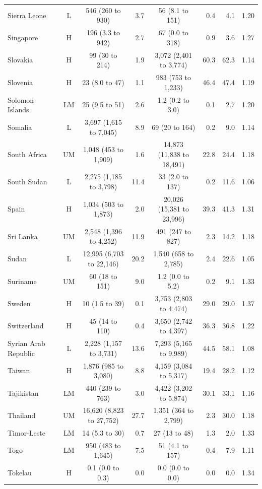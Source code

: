 \begin{longtable}{lccrcrrr}
Sierra Leone & L & 546 (260 to 930) & 3.7 & 56 (8.1 to 151) & 0.4 & 4.1 & 1.20 \\
Singapore & H & 196 (3.3 to 942) & 2.7 & 67 (0.0 to 318) & 0.9 & 3.6 & 1.27 \\
Slovakia & H & 99 (30 to 214) & 1.9 & 3,072 (2,401 to 3,774) & 60.3 & 62.3 & 1.14 \\
Slovenia & H & 23 (8.0 to 47) & 1.1 & 983 (753 to 1,233) & 46.4 & 47.4 & 1.19 \\
Solomon Islands & LM & 25 (9.5 to 51) & 2.6 & 1.2 (0.2 to 3.0) & 0.1 & 2.7 & 1.20 \\
Somalia & L & 3,697 (1,615 to 7,045) & 8.9 & 69 (20 to 164) & 0.2 & 9.0 & 1.14 \\
South Africa & UM & 1,048 (453 to 1,909) & 1.6 & 14,873 (11,838 to 18,491) & 22.8 & 24.4 & 1.18 \\
South Sudan & L & 2,275 (1,185 to 3,798) & 11.4 & 33 (2.0 to 137) & 0.2 & 11.6 & 1.06 \\
Spain & H & 1,034 (503 to 1,873) & 2.0 & 20,026 (15,381 to 23,996) & 39.3 & 41.3 & 1.31 \\
Sri Lanka & UM & 2,548 (1,396 to 4,252) & 11.9 & 491 (247 to 827) & 2.3 & 14.2 & 1.18 \\
Sudan & L & 12,995 (6,703 to 22,146) & 20.2 & 1,540 (658 to 2,785) & 2.4 & 22.6 & 1.05 \\
Suriname & UM & 60 (18 to 151) & 9.0 & 1.2 (0.0 to 5.2) & 0.2 & 9.1 & 1.33 \\
Sweden & H & 10 (1.5 to 39) & 0.1 & 3,753 (2,803 to 4,474) & 29.0 & 29.0 & 1.37 \\
Switzerland & H & 45 (14 to 110) & 0.4 & 3,650 (2,742 to 4,397) & 36.3 & 36.8 & 1.22 \\
Syrian Arab Republic & L & 2,228 (1,157 to 3,731) & 13.6 & 7,293 (5,165 to 9,989) & 44.5 & 58.1 & 1.08 \\
Taiwan & H & 1,876 (985 to 3,080) & 8.8 & 4,159 (3,084 to 5,317) & 19.4 & 28.2 & 1.12 \\
Tajikistan & LM & 440 (239 to 763) & 3.0 & 4,422 (3,202 to 5,874) & 30.1 & 33.1 & 1.16 \\
Thailand & UM & 16,620 (8,823 to 27,752) & 27.7 & 1,351 (364 to 2,799) & 2.3 & 30.0 & 1.18 \\
Timor-Leste & LM & 14 (5.3 to 30) & 0.7 & 27 (13 to 48) & 1.3 & 2.0 & 1.33 \\
Togo & LM & 950 (483 to 1,645) & 7.5 & 51 (4.1 to 157) & 0.4 & 7.9 & 1.11 \\
Tokelau & H & 0.1 (0.0 to 0.3) & 0.0 & 0.0 (0.0 to 0.0) & 0.0 & 0.0 & 1.34 \\

\end{longtable}
